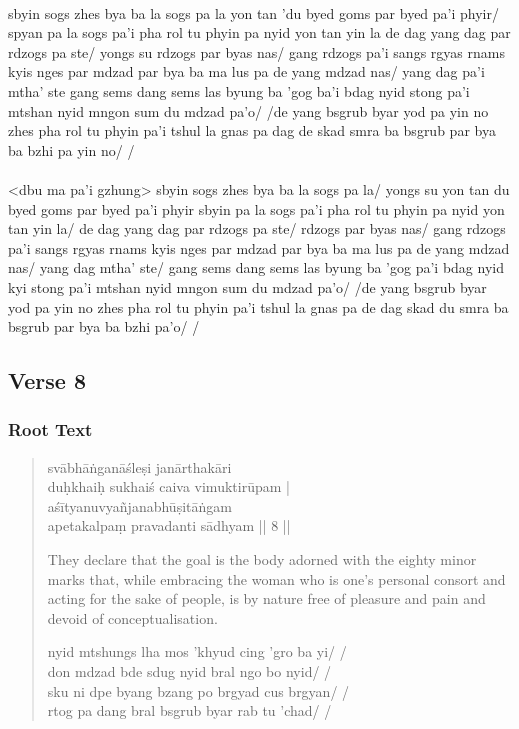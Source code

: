 \documentclass[12pt]{article}
\begin{document}
\textbf{\TVA}\\
sbyin sogs zhes bya ba la sogs pa la yon tan 'du byed goms par byed pa'i phyir/ spyan pa la sogs pa'i pha rol tu phyin pa nyid yon tan yin la de dag yang dag par rdzogs pa ste/ yongs su rdzogs par byas nas/ gang rdzogs pa'i sangs rgyas rnams kyis nges par mdzad par bya ba ma lus pa de yang mdzad nas/ yang dag pa'i mtha' ste gang sems dang sems las byung ba 'gog ba'i bdag nyid stong pa'i mtshan nyid mngon sum du mdzad pa'o/ /de yang bsgrub byar yod pa yin no zhes pha rol tu phyin pa'i tshul la gnas pa dag de skad smra ba bsgrub par bya ba bzhi pa yin no/ /\\

\textbf{\TVB}\\
<dbu ma pa'i gzhung> sbyin sogs zhes bya ba la sogs pa la/ yongs su yon tan du byed goms par byed pa'i phyir sbyin pa la sogs pa'i pha rol tu phyin pa nyid yon tan yin la/ de dag yang dag par rdzogs pa ste/ rdzogs par byas nas/ gang rdzogs pa'i sangs rgyas rnams kyis nges par mdzad par bya ba ma lus pa de yang mdzad nas/ yang dag mtha' ste/ gang sems dang sems las byung ba 'gog pa'i bdag nyid kyi stong pa'i mtshan nyid mngon sum du mdzad pa'o/ /de yang bsgrub byar yod pa yin no zhes pha rol tu phyin pa'i tshul la gnas pa de dag skad du smra ba bsgrub par bya ba bzhi pa'o/ /

\subsection{Verse 8}
\subsubsection{Root Text}
\begin{quote}
	svābhāṅganāśleṣi janārthakāri\footnoteB{
		janārthakāri] \conj\ (Tib: 'gro ba yi don mdzad; TaRaA-V: jagadarthakāri); ta..rthakāri \MS\ (\emph{akṣara uncertain, perhaps} gna \emph{or} mva); tadarthakāri \EDD
	} \\
	duḥkhaiḥ sukhaiś caiva vimuktirūpam |\\
	aśītyanuvyañjanabhūṣitāṅgam \\
	apetakalpaṃ pravadanti sādhyam || 8 ||
	
	They declare that the goal is the body adorned with the eighty minor marks that, while embracing the woman who is one's personal consort and acting for the sake of people, is by nature free of pleasure and pain and devoid of conceptualisation.

	nyid mtshungs lha mos 'khyud cing 'gro ba yi/ /\\
	don mdzad bde sdug nyid bral ngo bo nyid/ /\\
	sku ni dpe byang bzang po brgyad cus brgyan/ /\\
	rtog pa dang bral bsgrub byar rab tu 'chad/ /
\end{quote}
\end{document}
